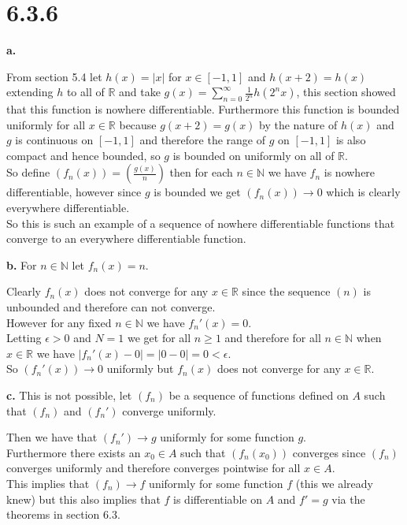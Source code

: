 \documentclass{article}
\begin{document}
\newpage
\section*{6.3.6}

{\Large\textbf{a.}}
\begin{center}
    \doublespacing
    From section 5.4 let $h(x) = |x|$ for $x\in [-1, 1]$ and $h(x + 2) = h(x)$ extending $h$ to all of $\mathbb{R}$ and take $g(x) =\sum _{n=0}^\infty\frac{1}{2^n} h(2^n x)$, this section showed that this function is nowhere differentiable. Furthermore this function is bounded uniformly for all $x\in\mathbb{R}$ because $g(x + 2) = g(x)$ by the nature of $h(x)$ and $g$ is continuous on $[-1, 1]$ and therefore the range of $g$ on $[-1, 1]$ is also compact and hence bounded, so $g$ is bounded on uniformly on all of $\mathbb{R}$.
    \\So define $(f_n (x)) = (\frac{g(x)}{n})$ then for each $n\in\mathbb{N}$ we have $f_n$ is nowhere differentiable, however since $g$ is bounded we get $(f_n (x))\rightarrow 0$ which is clearly everywhere differentiable.
    \\So this is such an example of a sequence of nowhere differentiable functions that converge to an everywhere differentiable function.
\end{center}

{\Large\textbf{b.}} For $n\in\mathbb{N}$ let $f_n (x) = n$.
\begin{center}
    \doublespacing
    Clearly $f_n (x)$ does not converge for any $x\in\mathbb{R}$ since the sequence $(n)$ is unbounded and therefore can not converge.
    \\However for any fixed $n\in\mathbb{N}$ we have $f_n '(x) = 0$.
    \\Letting $\epsilon > 0$ and $N = 1$ we get for all $n\geq 1$ and therefore for all $n\in\mathbb{N}$ when $x\in\mathbb{R}$ we have $|f_n '(x) - 0| = |0 - 0| = 0 <\epsilon$.
    \\So $(f_n '(x))\rightarrow 0$ uniformly but $f_n (x)$ does not converge for any $x\in\mathbb{R}$.
\end{center}

{\Large\textbf{c.}} This is not possible, let $(f_n)$ be a sequence of functions defined on $A$ such that $(f_n)$ and $(f_n ')$ converge uniformly.
\begin{center}
    \doublespacing
    Then we have that $(f_n ')\rightarrow g$ uniformly for some function $g$.
    \\Furthermore there exists an $x_0\in A$ such that $(f_n (x_0))$ converges since $(f_n)$ converges uniformly and therefore converges pointwise for all $x\in A$.
    \\This implies that $(f_n)\rightarrow f$ uniformly for some function $f$ (this we already knew) but this also implies that $f$ is differentiable on $A$ and $f' = g$ via the theorems in section 6.3.
\end{center}
\end{document}

